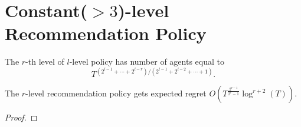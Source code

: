 
\section{Constant($>3$)-level Recommendation Policy}
The $r$-th level of $l$-level policy has number of agents equal to
\[
T^{(2^{l-1}+\cdots+2^{l-r})/(2^{l-1}+2^{l-2}+\cdots + 1)}.
\]


\begin{theorem}
The $r$-level recommendation policy gets expected regret $O\left(T^{\frac{2^{r-1}}{2^r-1}} \log^{r+2}(T)\right)$. 
\end{theorem}

\begin{proof}

\end{proof}
